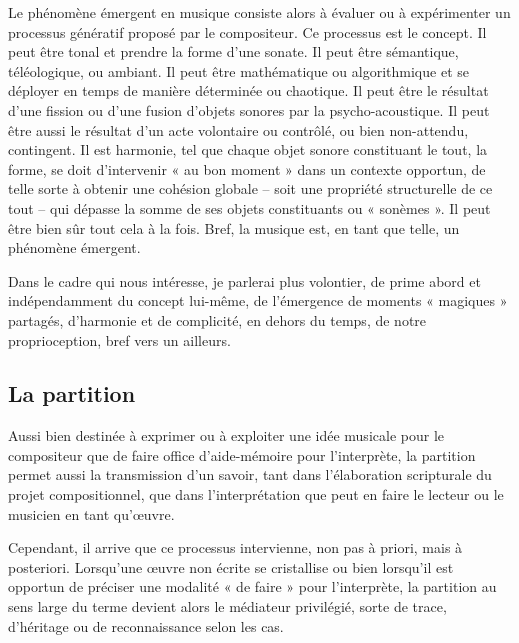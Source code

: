 Le phénomène émergent en musique consiste alors à évaluer ou à expérimenter un processus génératif proposé par le compositeur. Ce processus est le concept. Il peut être tonal et prendre la forme d'une sonate. Il peut être sémantique, téléologique, ou ambiant. Il peut être mathématique ou algorithmique et se déployer en temps de manière déterminée ou chaotique. Il peut être le résultat d'une fission ou d'une fusion d'objets sonores par la psycho-acoustique. Il peut être aussi le résultat d'un acte volontaire ou contrôlé, ou bien non-attendu, contingent. Il est harmonie, tel que chaque objet sonore constituant le tout, la forme, se doit d'intervenir « au bon moment » dans un contexte opportun, de telle sorte à obtenir une cohésion globale -- soit une propriété structurelle de ce tout -- qui dépasse la somme de ses objets constituants ou « sonèmes ». Il peut être bien sûr tout cela à la fois. Bref, la musique est, en tant que telle, un phénomène émergent.

Dans le cadre qui nous intéresse, je parlerai plus volontier, de prime abord et indépendamment du concept lui-même, de l'émergence de moments « magiques » partagés, d'harmonie et de complicité, en dehors du temps, de notre proprioception, bref vers un ailleurs.

\subsection*{La partition}
\label{score}
Aussi bien destinée à exprimer ou à exploiter une idée musicale pour le compositeur que de faire office d'aide-mémoire pour l'interprète, la partition permet aussi la transmission d'un savoir, tant dans l'élaboration scripturale du projet compositionnel, que dans l'interprétation que peut en faire le lecteur ou le musicien en tant qu'œuvre.

Cependant, il arrive que ce processus intervienne, non pas à priori, mais à posteriori. Lorsqu'une œuvre non écrite se cristallise ou bien lorsqu'il est opportun de préciser une modalité « de faire » pour l'interprète, la partition au sens large du terme devient alors le médiateur privilégié, sorte de trace, d'héritage ou de reconnaissance selon les cas.

